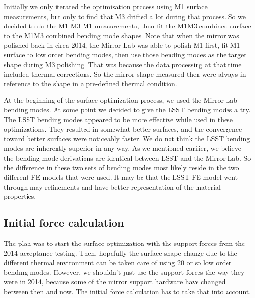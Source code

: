 \documentclass [twoside,openbib,12pt]{article}
\begin{document}
Initially we only
iterated the optimization process using M1 surface measurements, but
only to find that M3 drifted a lot during that process.
So we decided to do the M1-M3-M1 measurements, then fit the M1M3
combined surface to the M1M3 combined bending mode shapes.
Note that when the mirror was polished back in circa 2014, the Mirror
Lab was able to polish M1 first, fit M1 surface to low order bending
modes, then use those bending modes as the target shape during M3
polishing. That was because the data processing at that time included
thermal corrections. So the mirror shape measured then were always in
reference to the shape in a pre-defined thermal condition.

At the beginning of the surface optimization process, we used the
Mirror Lab bending modes. At some point we decided to give the LSST
bending modes a try. The LSST bending modes appeared to be
more effective while used in these optimizations. They resulted in
somewhat better surfaces, and the convergence toward better surfaces
were noticeably faster.
We do not think the LSST bending modes are inherently superior in any  
way.  
As we mentioned earilier, we believe the bending mode derivations are
identical between LSST and the Mirror Lab. So the difference in these
two sets of bending modes most likely reside in the two different FE
models that were used. It may be that the LSST FE model went through
may refinements and have better representation of the material properties.

\subsection{Initial force calculation}
\label{sec:initF}

The plan was to start the surface optimization with the support forces
from the 2014 acceptance testing. Then, hopefully the surface shape
change due to the different thermal environment can be taken care of
using 20 or so low order bending modes.
However, we shouldn't just use the support forces the way they were in
2014, because some of the mirror support hardware have changed between
then and now. The initial force calculation has to take that into
account.
\end{document}

